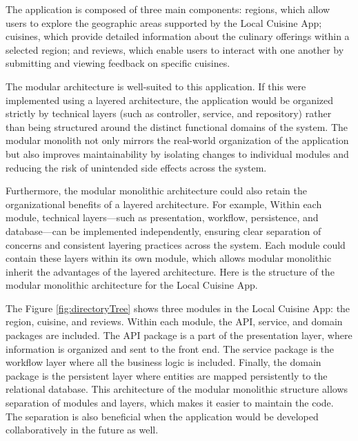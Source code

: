 The application is composed of three main components: regions, which allow users to explore the geographic areas supported by the Local Cuisine App;
cuisines, which provide detailed information about the culinary offerings within a selected region;
and reviews, which enable users to interact with one another by submitting and viewing feedback on specific cuisines.

The modular architecture is well-suited to this application. If this were implemented using a layered architecture,
the application would be organized strictly by technical layers (such as controller, service, and repository)
rather than being structured around the distinct functional domains of the system. 
The modular monolith not only mirrors the real-world organization of the application
but also improves maintainability by isolating changes to individual modules
and reducing the risk of unintended side effects across the system.

Furthermore, the modular monolithic architecture could also retain the organizational benefits of a layered architecture.
For example, Within each module, technical layers—such as presentation, workflow, persistence, and database—can be implemented independently,
ensuring clear separation of concerns and consistent layering practices across the system.
Each module could contain these layers within its own module, which allows modular monolithic inherit the advantages 
of the layered architecture. Here is the structure of the modular monolithic architecture for the Local Cuisine App.


\directoryTreeFigure

The Figure \ref{fig:directoryTree} shows three modules in the Local Cuisine App: the region, cuisine, and reviews.
Within each module, the API, service, and domain packages are included. The API package is a part of the presentation layer, where 
information is organized and sent to the front end. The service package is the workflow layer where all the business logic is included.
Finally, the domain package is the persistent layer where entities are mapped persistently to the relational database.
This architecture of the modular monolithic structure allows separation of modules and layers, which makes it easier to maintain the code.
The separation is also beneficial when the application would be developed collaboratively in the future as well.

